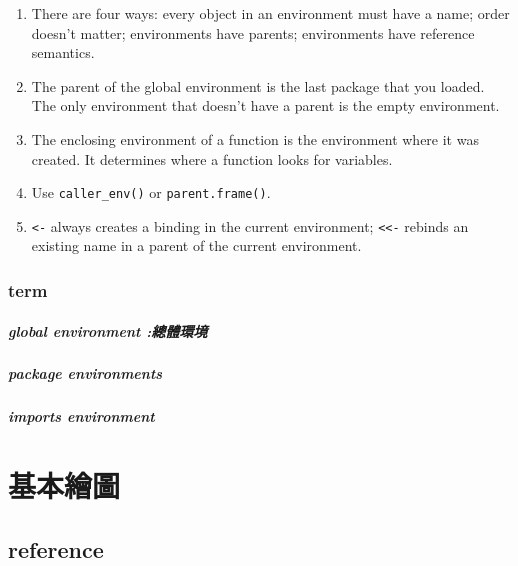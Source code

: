 \documentclass[]{book}
\let\oldparagraph\paragraph
\renewcommand{\paragraph}[1]{\oldparagraph{#1}\mbox{}}
\theoremstyle{definition}
\theoremstyle{definition}
\theoremstyle{definition}
\theoremstyle{remark}
\begin{document}
\begin{enumerate}
\def\labelenumi{\arabic{enumi}.}
\item
  There are four ways: every object in an environment must have a name;
  order doesn't matter; environments have parents; environments have
  reference semantics.
\item
  The parent of the global environment is the last package that you
  loaded. The only environment that doesn't have a parent is the empty
  environment.
\item
  The enclosing environment of a function is the environment where it
  was created. It determines where a function looks for variables.
\item
  Use \texttt{caller\_env()} or \texttt{parent.frame()}.
\item
  \texttt{\textless{}-} always creates a binding in the current
  environment; \texttt{\textless{}\textless{}-} rebinds an existing name
  in a parent of the current environment.
\end{enumerate}

\hypertarget{term}{%
\subsection{term}\label{term}}

\hypertarget{global-environment}{%
\paragraph{global environment :總體環境}\label{global-environment}}

\hypertarget{package-environments}{%
\paragraph{package environments}\label{package-environments}}

\hypertarget{imports-environment}{%
\paragraph{imports environment}\label{imports-environment}}

\chapter{基本繪圖}

\hypertarget{reference}{%
\section{reference}\label{reference}}
\end{document}
